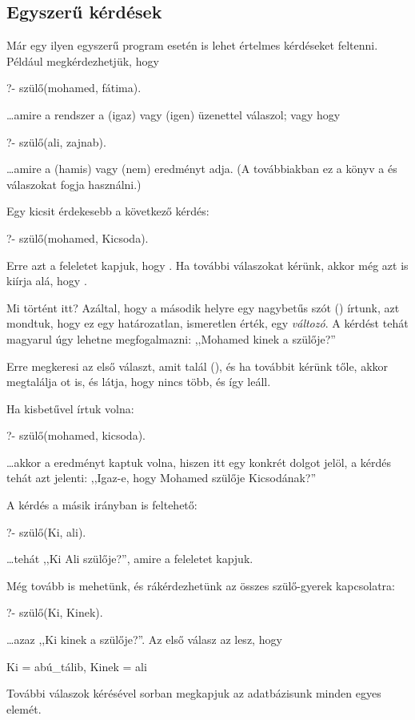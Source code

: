 \subsection*{Egyszerű kérdések}

Már egy ilyen egyszerű program esetén is lehet
értelmes kérdéseket feltenni. Például
megkérdezhetjük, hogy
\begin{query}
?- szülő(mohamed, fátima).
\end{query}
\dots amire a rendszer a  (igaz) vagy
 (igen) üzenettel
válaszol; vagy hogy
\begin{query}
?- szülő(ali, zajnab).
\end{query}
\dots amire a  (hamis) vagy  (nem)
eredményt adja. (A
továbbiakban ez a könyv a  és 
válaszokat fogja használni.)

Egy kicsit érdekesebb a következő kérdés:
\begin{query}
?- szülő(mohamed, Kicsoda).
\end{query}
Erre azt a feleletet kapjuk, hogy . Ha további válaszokat kérünk, akkor még
azt is kiírja alá, hogy .

Mi történt itt? Azáltal, hogy a második helyre egy
nagybetűs szót () írtunk, azt mondtuk,
hogy ez egy határozatlan, ismeretlen érték, egy
\emph{változó}. A kérdést tehát
magyarul úgy lehetne megfogalmazni: ,,Mohamed kinek
a szülője?''

Erre megkeresi az első választ, amit talál
(), és ha továbbit kérünk tőle, akkor
megtalálja ot is, és látja, hogy nincs
több, és így leáll.

Ha kisbetűvel írtuk volna:
\begin{query}
?- szülő(mohamed, kicsoda).
\end{query}
\dots akkor a  eredményt kaptuk volna,
hiszen  itt egy konkrét dolgot jelöl, a
kérdés tehát azt jelenti: ,,Igaz-e, hogy Mohamed
szülője Kicsodának?''

A kérdés a másik irányban is feltehető:
\begin{query}
?- szülő(Ki, ali).
\end{query}
\dots tehát ,,Ki Ali szülője?'', amire a  feleletet kapjuk.

Még tovább is mehetünk, és rákérdezhetünk az összes
szülő-gyerek kapcsolatra:
\begin{query}
?- szülő(Ki, Kinek).
\end{query}
\dots azaz ,,Ki kinek a szülője?''. Az első válasz
az lesz, hogy
\begin{query}
Ki = abú_tálib,
Kinek = ali
\end{query}
További válaszok kérésével sorban megkapjuk az
adatbázisunk minden egyes elemét.


